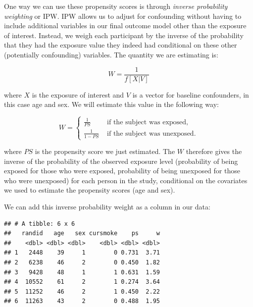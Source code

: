 \documentclass[
]{book}
\newenvironment{Shaded}{\begin{snugshade}}{\end{snugshade}}
\newcommand{\DataTypeTok}[1]{\textcolor[rgb]{0.13,0.29,0.53}{#1}}
\newcommand{\DecValTok}[1]{\textcolor[rgb]{0.00,0.00,0.81}{#1}}
\newcommand{\KeywordTok}[1]{\textcolor[rgb]{0.13,0.29,0.53}{\textbf{#1}}}
\newcommand{\NormalTok}[1]{#1}
\newcommand{\OperatorTok}[1]{\textcolor[rgb]{0.81,0.36,0.00}{\textbf{#1}}}
\newcommand{\StringTok}[1]{\textcolor[rgb]{0.31,0.60,0.02}{#1}}
\begin{document}
One way we can use these propensity scores is through \emph{inverse probability weighting} or IPW. IPW allows us to adjust for confounding without having to include additional variables in our final outcome model other than the exposure of interest. Instead, we weigh each participant by the inverse of the probability that they had the exposure value they indeed had conditional on these other (potentially confounding) variables. The quantity we are estimating is:

\[
W=\frac{1}{f[X|V]}
\]

where \(X\) is the exposure of interest and \(V\) is a vector for baseline confounders, in this case age and sex. We will estimate this value in the following way:

\[
W = \begin{cases}
\frac{1}{PS} &\mbox{ if the subject was exposed},\\
\frac{1}{1-PS} &\mbox{ if the subject was unexposed.}
\end{cases}
\]

where \(PS\) is the propensity score we just estimated. The \(W\) therefore gives the inverse of the probability of the observed exposure level (probability of being exposed for those who were exposed, probability of being unexposed for those who were unexposed) for each person in the study, conditional on the covariates we used to estimate the propensity scores (age and sex).

We can add this inverse probability weight as a column in our data:

\begin{Shaded}
\end{Shaded}

\begin{verbatim}
## # A tibble: 6 x 6
##   randid   age   sex cursmoke    ps     w
##    <dbl> <dbl> <dbl>    <dbl> <dbl> <dbl>
## 1   2448    39     1        0 0.731  3.71
## 2   6238    46     2        0 0.450  1.82
## 3   9428    48     1        1 0.631  1.59
## 4  10552    61     2        1 0.274  3.64
## 5  11252    46     2        1 0.450  2.22
## 6  11263    43     2        0 0.488  1.95
\end{verbatim}
\end{document}
